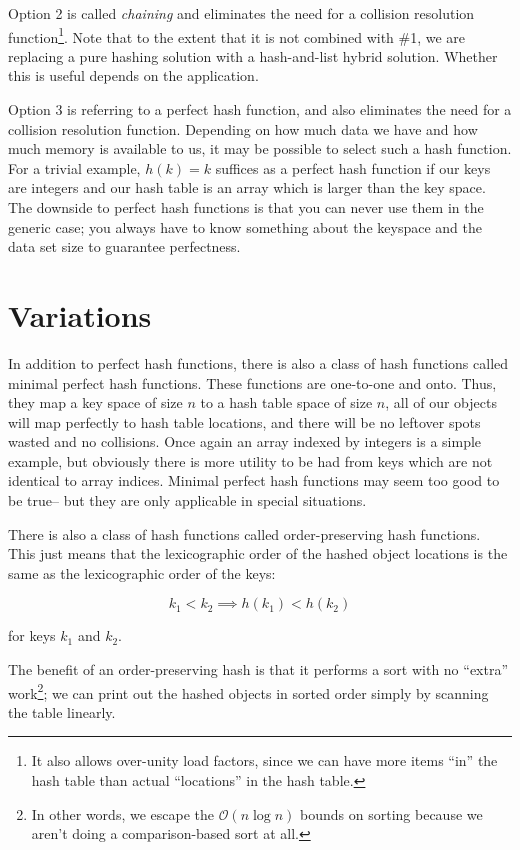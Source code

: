 \documentclass[12pt]{article}
\newcommand{\bigo}{\mathcal{O}}
\begin{document}
Option 2 is called \emph{chaining} and eliminates the need for a collision resolution function\footnote{It also allows over-unity load factors, since we can have more items ``in'' the hash table than actual ``locations'' in the hash table.}.  Note that to the extent that it is not combined with \#1, we are replacing a pure hashing solution with a hash-and-list hybrid solution.  Whether this is useful depends on the application.

Option 3 is referring to a perfect hash function, and also eliminates the need for a collision resolution function.  Depending on how much data we have and how much memory is available to us,  it may be possible to select such a hash function.  For a trivial example, $h(k) = k$ suffices as a perfect hash function if our keys are integers and our hash table is an array which is larger than the key space.  The downside to perfect hash functions is that you can never use them in the generic case; you always have to know something about the keyspace and the data set size to guarantee perfectness.

\section{Variations}

In addition to perfect hash functions, there is also a class of hash functions called minimal perfect hash functions.  These functions are one-to-one and onto.  Thus, they map a key space of size $n$ to a hash table space of size $n$, all of our objects will map perfectly to hash table locations, and there will be no leftover spots wasted and no collisions.  Once again an array indexed by integers is a simple example, but obviously there is more utility to be had from keys which are not identical to array indices.  Minimal perfect hash functions may seem too good to be true-- but they are only applicable in special situations.

There is also a class of hash functions called order-preserving hash functions.  This just means that the lexicographic order of the hashed object locations is the same as the lexicographic order of the keys:

$$ k_1 < k_2 \implies h(k_1) < h(k_2) $$

for keys $k_1$ and $k_2$.  

The benefit of an order-preserving hash is that it performs a sort with no ``extra'' work\footnote{In other words, we escape the $\bigo(n \log{n})$ bounds on sorting because we aren't doing a comparison-based sort at all.}; we can print out the hashed objects in sorted order simply by scanning the table linearly. 
\end{document}
